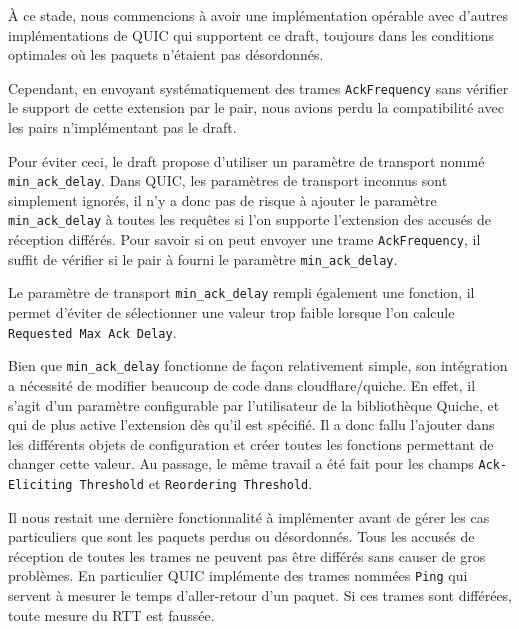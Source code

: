 \vspace{0.5cm}

À ce stade, nous commencions à avoir une implémentation opérable avec d'autres implémentations de QUIC qui supportent ce draft, toujours dans les conditions optimales où les paquets n'étaient pas désordonnés.

Cependant, en envoyant systématiquement des trames \verb|AckFrequency| sans vérifier le support de cette extension par le pair, nous avions perdu la compatibilité avec les pairs n'implémentant pas le draft.

\vspace{0.5cm}

Pour éviter ceci, le draft propose d'utiliser un paramètre de transport nommé \verb|min_ack_delay|. Dans QUIC, les paramètres de transport inconnus sont simplement ignorés, il n'y a donc pas de risque à ajouter le paramètre \verb|min_ack_delay| à toutes les requêtes si l'on supporte l'extension des accusés de réception différés. Pour savoir si on peut envoyer une trame \verb|AckFrequency|, il suffit de vérifier si le pair à fourni le paramètre \verb|min_ack_delay|.

\vspace{0.5cm}

Le paramètre de transport \verb|min_ack_delay| rempli également une fonction, il permet d'éviter de sélectionner une valeur trop faible lorsque l'on calcule \texttt{Requested Max Ack Delay}.

\vspace{0.5cm}

Bien que \verb|min_ack_delay| fonctionne de façon relativement simple, son intégration a nécessité de modifier beaucoup de code dans cloudflare/quiche.
En effet, il s'agit d'un paramètre configurable par l'utilisateur de la bibliothèque Quiche, et qui de plus active l'extension dès qu'il est spécifié. Il a donc fallu l'ajouter dans les différents objets de configuration et créer toutes les fonctions permettant de changer cette valeur. Au passage, le même travail a été fait pour les champs \texttt{Ack-Eliciting Threshold} et \texttt{Reordering Threshold}.

\vspace{0.5cm}

Il nous restait une dernière fonctionnalité à implémenter avant de gérer les cas particuliers que sont les paquets perdus ou désordonnés.
Tous les accusés de réception de toutes les trames ne peuvent pas être différés sans causer de gros problèmes. En particulier QUIC implémente des trames nommées \texttt{Ping} qui servent à mesurer le temps d'aller-retour d'un paquet. Si ces trames sont différées, toute mesure du RTT est faussée.


